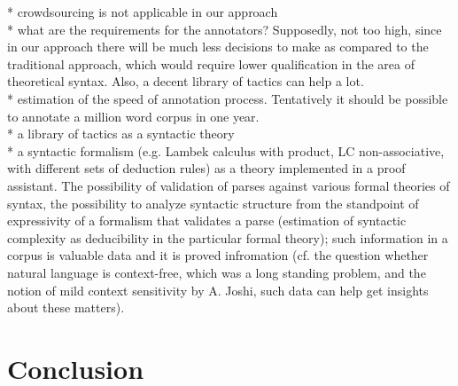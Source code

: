 \documentclass[a4paper]{article}
\theoremstyle{example-style}
\begin{document}
  * crowdsourcing is not applicable in our approach \\
  
  * what are the requirements for the annotators? Supposedly, not too high, since in our approach there will be much less decisions  to make as compared to the traditional approach, which would require lower qualification in the area of theoretical syntax. Also, a decent library of tactics can help a lot. \\
  
  * estimation of the speed of annotation process. Tentatively it should be possible to annotate a million word corpus in one year.\\
  
  * a library of tactics as a syntactic theory \\
  
  * a syntactic formalism (e.g. Lambek calculus with product, LC non-associative, with different sets of deduction rules) as a theory implemented in a proof assistant. The possibility of validation of parses against various formal theories of syntax, the possibility to analyze syntactic structure from the standpoint of expressivity of a formalism that validates a parse (estimation of syntactic complexity as deducibility in the particular formal theory); such information in a corpus is valuable data and it is proved infromation (cf. the question whether natural language is context-free, which was a long standing problem, and the notion of mild context sensitivity by A. Joshi, such data can help get insights about these matters).

\section{Conclusion}


\nocite{*}
\printbibliography[resetnumbers=true]
\end{document}
